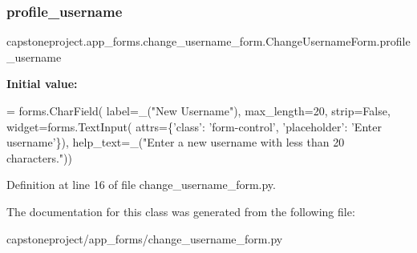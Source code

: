 \subsubsection{\texorpdfstring{profile\+\_\+username}{profile\_username}}
{\footnotesize\ttfamily capstoneproject.\+app\+\_\+forms.\+change\+\_\+username\+\_\+form.\+Change\+Username\+Form.\+profile\+\_\+username\hspace{0.3cm}{\ttfamily [static]}}

{\bfseries Initial value\+:}
\begin{DoxyCode}
=  forms.CharField(
        label=\_(\textcolor{stringliteral}{"New Username"}),
        max\_length=20,
        strip=\textcolor{keyword}{False},
        widget=forms.TextInput(
            attrs=\{\textcolor{stringliteral}{'class'}: \textcolor{stringliteral}{'form-control'},
                   \textcolor{stringliteral}{'placeholder'}: \textcolor{stringliteral}{'Enter username'}\}),
        help\_text=\_(\textcolor{stringliteral}{"Enter a new username with less than 20 characters."}))
\end{DoxyCode}


Definition at line 16 of file change\+\_\+username\+\_\+form.\+py.



The documentation for this class was generated from the following file\+:\begin{DoxyCompactItemize}
\item 
capstoneproject/app\+\_\+forms/change\+\_\+username\+\_\+form.\+py\end{DoxyCompactItemize}
